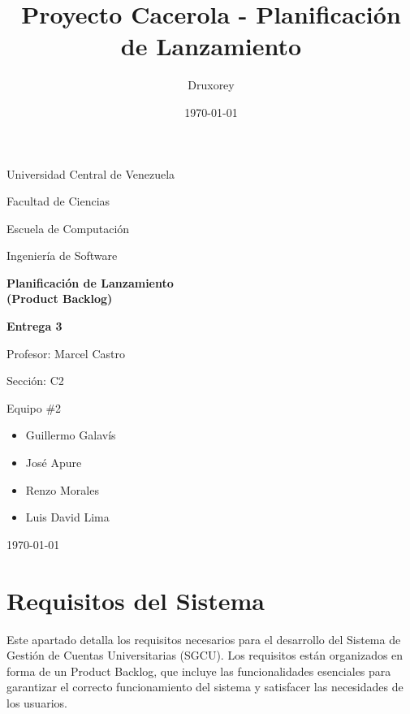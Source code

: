 \documentclass[12pt]{article}
\title{Proyecto Cacerola - Planificación de Lanzamiento} %
\author{Druxorey} %
\date{\today} %
\begin{document}
\begin{titlepage}
	\centering
	\vspace{1cm}
	{\large {Universidad Central de Venezuela}\par}
	{\large {Facultad de Ciencias}\par}
	{\large {Escuela de Computación}\par}
	{\large {Ingeniería de Software}\par}
	\vspace{6cm}
	{\LARGE \textbf{Planificación de Lanzamiento \\ (Product Backlog)}\par}
	\vspace{0.25cm}
	{\Large \textbf{Entrega 3}\par}
	\vfill
	\begin{flushleft}
		{\large Profesor: Marcel Castro\par\vspace{-0.5em}}
		{\large Sección: C2\par\vspace{-0.5em}}
		{\large Equipo \#2\par\vspace{-1em}}
		\begin{itemize}
			\item Guillermo Galavís\vspace{-0.5em}
			\item José Apure\vspace{-0.5em}
			\item Renzo Morales\vspace{-0.5em}
			\item Luis David Lima\vspace{-0.5em}
		\end{itemize}
	\end{flushleft}
	\vspace{0.5cm}
	\centering
	{\large \today\par}
\end{titlepage}

\section{Requisitos del Sistema}

Este apartado detalla los requisitos necesarios para el desarrollo del Sistema de Gestión de Cuentas Universitarias (SGCU). Los requisitos están organizados en forma de un Product Backlog, que incluye las funcionalidades esenciales para garantizar el correcto funcionamiento del sistema y satisfacer las necesidades de los usuarios.
\end{document}

